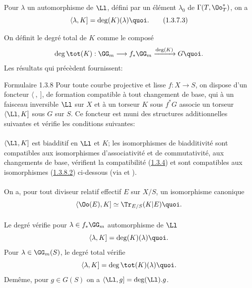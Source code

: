 Pour $\lambda$ un automorphisme de $\Ll$, défini par un
élément $\lambda_{0}$ de $\Gamma(T,\Oo^{\ast}_{T})$, on a
\begin{equation*}
\langle \lambda,K]=\deg(K)(\lambda){\quoi}.\tag{1.3.7.3}
\end{equation*}

On définit le degré total de $K$ comme le composé
$$
\deg \tot(K):\GG_{m}\longrightarrow
f_{\ast}\GG_{m}\xrightarrow{\deg(K)}G{\quoi}.
$$
Les résultats qui précèdent fournissent:

\begin{enonce*}[remark]{Formulaire 1.3.8}
Pour toute courbe projective et lisse $f:X\rightarrow S$, on dispose
d'un foncteur $\langle~,~]$, de formation compatible à tout changement de
base, qui à un faisceau inversible $\Ll$ sur $X$ et à un
torseur $K$ sous $f^{\ast}G$ associe un torseur $\langle \Ll,K]$ sous
$G$ sur $S$. Ce foncteur est muni des structures additionnelles
suivantes et vérifie les conditions suivantes:
\end{enonce*}

\setcounter{subsubsection}{8}
\paragraph{}
$\langle \Ll,K]$ est biadditif en $\Ll$ et $K$; les
isomorphismes de biadditivité sont compatibles aux isomorphismes
d'associativité et de commutativité, aux changements de base,
vérifient la compatibilité (\hyperref[XVIII.prop1.3.4]{1.3.4}) et sont compatibles aux
isomorphismes (\hyperref[XVIII.par1.3.8.2]{1.3.8.2}) ci-dessous (via
 et ).

\paragraph{}
On a, pour tout diviseur relatif effectif $E$ sur $X/S$, un
isomorphisme canonique
$$
\langle \Oo(E),K]\simeq \Tr_{E/S}(K|E){\quoi}.
$$

\paragraph{}
Le degré  vérifie pour $\lambda\in f_{\ast}\GG_{m}$
automorphisme de $\Ll$
$$
\langle \lambda,K]=\deg(K)(\lambda){\quoi}.
$$
Pour $\lambda\in \GG_{m}(S)$, le degré total vérifie
$$
\langle \lambda,K]=\deg\tot(K)(\lambda){\quoi}.
$$
De\pageoriginale même, pour $g\in G(S)$ on a
$\langle \Ll,g]=\deg(\Ll).g$.

